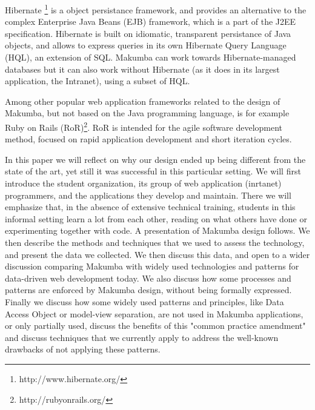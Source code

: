 \documentclass{llncs}
\begin{document}
Hibernate \footnote{http://www.hibernate.org/} is a object persistance framework, and provides an alternative to the complex Enterprise Java Beans (EJB) framework, which is a part of the J2EE specification. Hibernate is built on idiomatic, transparent persistance of Java objects, and allows to express queries in its own Hibernate Query Language (HQL), an extension of SQL. Makumba can work towards Hibernate-managed databases but it can also work without Hibernate (as it does in its largest application, the Intranet), using a subset of HQL.

Among other popular web application frameworks related to the design of Makumba, but not based on the Java programming language, is for example Ruby on Rails (RoR)\footnote{http://rubyonrails.org/}. RoR is intended for the agile software development method, focused on rapid application development and short iteration cycles.

In this paper we will  reflect on why our design ended up being different from the state of the art, yet still it was successful in this particular setting. We will first introduce the student organization, its group of web application (inrtanet) programmers, and the applications they develop and maintain. There we will emphasize that, in the absence of extensive technical training, students in this informal setting learn  a lot from each other, reading on what others have done or experimenting together with code. A presentation of Makumba design follows. We then describe the methods and techniques that we used to assess the technology, and present the data we collected. We then discuss this data, and open to  a wider discussion comparing Makumba with widely used technologies and patterns for data-driven web development today. We also discuss how some processes and patterns are enforced by Makumba design, without being formally expressed. Finally we discuss how some widely used patterns and principles, like Data Access Object or model-view separation, are not used in Makumba applications, or only partially used, discuss the benefits of this "common practice amendment" and discuss techniques that we currently apply to address the well-known drawbacks of not applying these patterns.\\
\end{document}
